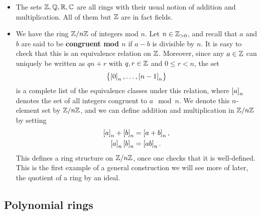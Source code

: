 \begin{example*}
\hfill
\begin{itemize}
\item The sets $ \mathbb{Z}, \mathbb{Q}, \mathbb{R}, \mathbb{C} $ are all rings with their usual notion of addition and multiplication. All of them but $ \mathbb{Z} $ are in fact fields.
\item We have the ring $ \mathbb{Z} / n\mathbb{Z} $ of integers mod $ n $. Let $ n \in \mathbb{Z}_{> 0} $, and recall that $ a $ and $ b $ are said to be \textbf{congruent mod $ n $} if $ a - b $ is divisible by $ n $. It is easy to check that this is an equivalence relation on $ \mathbb{Z} $. Moreover, since any $ a \in \mathbb{Z} $ can uniquely be written as $ qn + r $ with $ q, r \in \mathbb{Z} $ and $ 0 \le r < n $, the set
$$ \cbr{\sbr{0}_n, \dots, \sbr{n - 1}_n} $$
is a complete list of the equivalence classes under this relation, where $ \sbr{a}_n $ denotes the set of all integers congruent to $ a \mod n $. We denote this $ n $-element set by $ \mathbb{Z} / n\mathbb{Z} $, and we can define addition and multiplication in $ \mathbb{Z} / n\mathbb{Z} $ by setting
\begin{align*}
\sbr{a}_n + \sbr{b}_n & = \sbr{a + b}_n, \\
\sbr{a}_n\sbr{b}_n & = \sbr{ab}_n.
\end{align*}
This defines a ring structure on $ \mathbb{Z} / n\mathbb{Z} $, once one checks that it is well-defined. This is the first example of a general construction we will see more of later, the quotient of a ring by an ideal.
\end{itemize}
\end{example*}

\pagebreak

\subsection{Polynomial rings}


